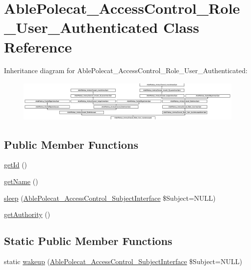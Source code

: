 \hypertarget{class_able_polecat___access_control___role___user___authenticated}{}\section{Able\+Polecat\+\_\+\+Access\+Control\+\_\+\+Role\+\_\+\+User\+\_\+\+Authenticated Class Reference}
\label{class_able_polecat___access_control___role___user___authenticated}
Inheritance diagram for Able\+Polecat\+\_\+\+Access\+Control\+\_\+\+Role\+\_\+\+User\+\_\+\+Authenticated\+:\begin{figure}[H]
\begin{center}
\leavevmode
\includegraphics[height=2.079576cm]{class_able_polecat___access_control___role___user___authenticated}
\end{center}
\end{figure}
\subsection*{Public Member Functions}
\begin{DoxyCompactItemize}
\item 
\hyperlink{class_able_polecat___access_control___role___user___authenticated_a12251d0c022e9e21c137a105ff683f13}{get\+Id} ()
\item 
\hyperlink{class_able_polecat___access_control___role___user___authenticated_a3d0963e68bb313b163a73f2803c64600}{get\+Name} ()
\item 
\hyperlink{class_able_polecat___access_control___role___user___authenticated_a365e24d7b066205cafa2a5cce3a4f224}{sleep} (\hyperlink{interface_able_polecat___access_control___subject_interface}{Able\+Polecat\+\_\+\+Access\+Control\+\_\+\+Subject\+Interface} \$Subject=N\+U\+L\+L)
\item 
\hyperlink{class_able_polecat___access_control___role___user___authenticated_a1f73860dd14340c5bad9094f0b5b97c2}{get\+Authority} ()
\end{DoxyCompactItemize}
\subsection*{Static Public Member Functions}
\begin{DoxyCompactItemize}
\item 
static \hyperlink{class_able_polecat___access_control___role___user___authenticated_a3f2135f6ad45f51d075657f6d20db2cd}{wakeup} (\hyperlink{interface_able_polecat___access_control___subject_interface}{Able\+Polecat\+\_\+\+Access\+Control\+\_\+\+Subject\+Interface} \$Subject=N\+U\+L\+L)
\end{DoxyCompactItemize}
